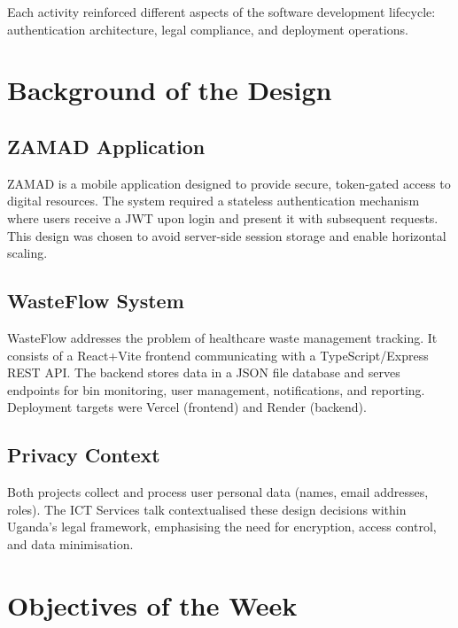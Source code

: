 \documentclass[12pt,a4paper]{article}
\begin{document}
Each activity reinforced different aspects of the software development lifecycle: authentication architecture, legal compliance, and deployment operations.

\section{Background of the Design}
\label{sec:background}

\subsection{ZAMAD Application}
ZAMAD is a mobile application designed to provide secure, token-gated access to digital resources. The system required a stateless authentication mechanism where users receive a JWT upon login and present it with subsequent requests. This design was chosen to avoid server-side session storage and enable horizontal scaling.

\subsection{WasteFlow System}
WasteFlow addresses the problem of healthcare waste management tracking. It consists of a React+Vite frontend communicating with a TypeScript/Express REST API. The backend stores data in a JSON file database and serves endpoints for bin monitoring, user management, notifications, and reporting. Deployment targets were Vercel (frontend) and Render (backend).

\subsection{Privacy Context}
Both projects collect and process user personal data (names, email addresses, roles). The ICT Services talk contextualised these design decisions within Uganda's legal framework, emphasising the need for encryption, access control, and data minimisation.

\section{Objectives of the Week}
\label{sec:objectives}
\end{document}
